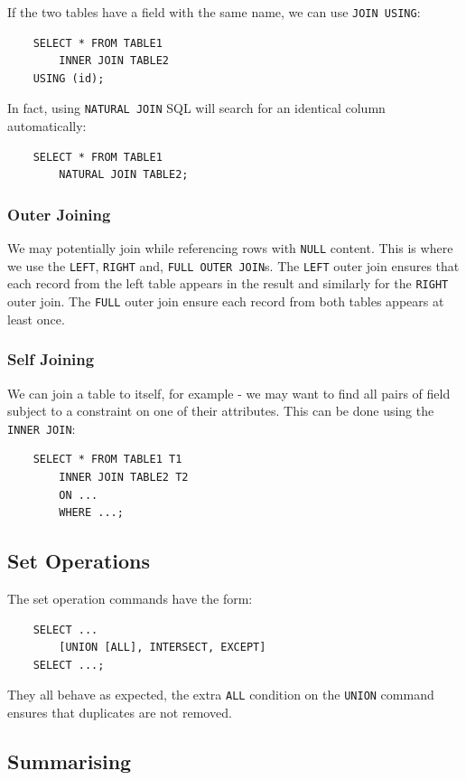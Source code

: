 \newpage
\noindent
If the two tables have a field with the same
name, we can use \texttt{JOIN USING}: \begin{lstlisting}
    SELECT * FROM TABLE1 
        INNER JOIN TABLE2
    USING (id);
\end{lstlisting} In fact, using \texttt{NATURAL JOIN} SQL will
search for an identical column automatically: \begin{lstlisting}
    SELECT * FROM TABLE1 
        NATURAL JOIN TABLE2;
\end{lstlisting}

\subsubsection{Outer Joining}

We may potentially join while referencing rows with \texttt{NULL}
content. This is where we use the \texttt{LEFT}, \texttt{RIGHT}
and, \texttt{FULL OUTER JOIN}s. The \texttt{LEFT} outer join
ensures that each record from the left table appears in the
result and similarly for the \texttt{RIGHT} outer join.
The \texttt{FULL} outer join ensure each record from both tables
appears at least once.

\subsubsection{Self Joining}

We can join a table to itself, for example - we may want to
find all pairs of field subject to a constraint on one
of their attributes. This can be done using the \texttt{INNER JOIN}:
\begin{lstlisting}
    SELECT * FROM TABLE1 T1
        INNER JOIN TABLE2 T2
        ON ...
        WHERE ...;
\end{lstlisting}

\subsection{Set Operations}

The set operation commands have the form: \begin{lstlisting}
    SELECT ...
        [UNION [ALL], INTERSECT, EXCEPT]
    SELECT ...;
\end{lstlisting} They all behave as expected, the extra \texttt{ALL}
condition on the \texttt{UNION} command ensures that duplicates
are not removed.

\subsection{Summarising}

